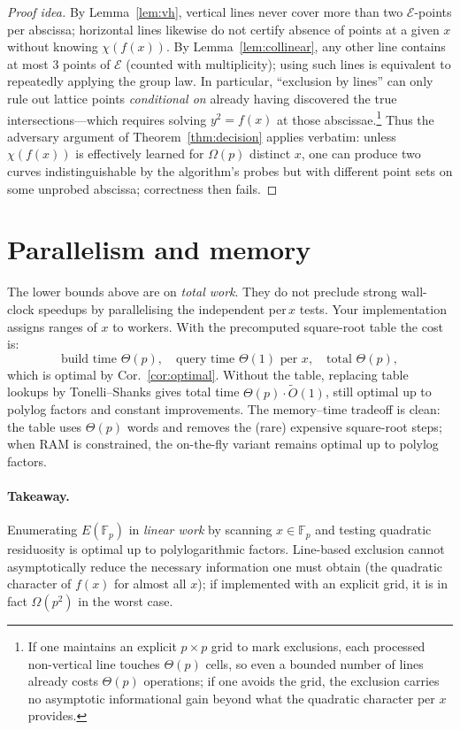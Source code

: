 \documentclass[11pt]{article}
\newcommand{\Fp}{\mathbb{F}_p}
\newcommand{\E}{\mathcal{E}}
\begin{document}
\begin{proof}[Proof idea]
By Lemma~\ref{lem:vh}, vertical lines never cover more than two $\E$-points per abscissa; horizontal lines likewise do not certify absence of points at a given $x$ without knowing $\chi(f(x))$.
By Lemma~\ref{lem:collinear}, any other line contains at most $3$ points of $\E$ (counted with multiplicity); using such lines is equivalent to repeatedly applying the group law.
In particular, ``exclusion by lines'' can only rule out lattice points \emph{conditional on} already having discovered the true intersections---which requires solving $y^2=f(x)$ at those abscissae.\footnote{If one maintains an explicit $p\times p$ grid to mark exclusions, each processed non-vertical line touches $\Theta(p)$ cells, so even a bounded number of lines already costs $\Theta(p)$ operations; if one avoids the grid, the exclusion carries no asymptotic informational gain beyond what the quadratic character per $x$ provides.}
Thus the adversary argument of Theorem~\ref{thm:decision} applies verbatim: unless $\chi(f(x))$ is effectively learned for $\Omega(p)$ distinct $x$, one can produce two curves indistinguishable by the algorithm's probes but with different point sets on some unprobed abscissa; correctness then fails.
\end{proof}

\section*{Parallelism and memory}
The lower bounds above are on \emph{total work}. They do not preclude strong wall-clock speedups by parallelising the independent per\,$x$ tests. Your implementation assigns ranges of $x$ to workers. With the precomputed square-root table the cost is:
\[
  \text{build time } \Theta(p),\quad \text{query time } \Theta(1) \text{ per } x,\quad \text{total } \Theta(p),
\]
which is optimal by Cor.~\ref{cor:optimal}.
Without the table, replacing table lookups by Tonelli--Shanks gives total time $\Theta(p)\cdot\tilde O(1)$, still optimal up to polylog factors and constant improvements.
The memory--time tradeoff is clean: the table uses $\Theta(p)$ words and removes the (rare) expensive square-root steps; when RAM is constrained, the on-the-fly variant remains optimal up to polylog factors.

\paragraph{Takeaway.}
Enumerating $E(\Fp)$ in \emph{linear work} by scanning $x\in\Fp$ and testing quadratic residuosity is optimal up to polylogarithmic factors. Line-based exclusion cannot asymptotically reduce the necessary information one must obtain (the quadratic character of $f(x)$ for almost all $x$); if implemented with an explicit grid, it is in fact $\Omega(p^2)$ in the worst case.
\end{document}
